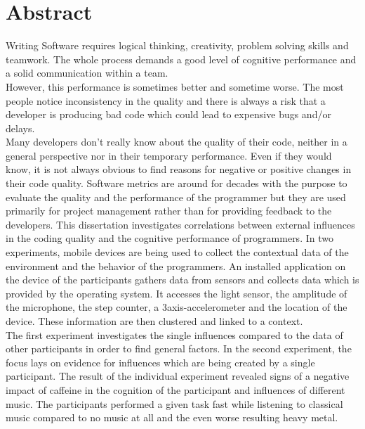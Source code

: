 \section*{Abstract}


Writing Software requires logical thinking, creativity, problem solving skills and teamwork. The whole process demands a good level of cognitive performance and a solid communication within a team.\\
However, this performance is sometimes better and sometime worse. The most people notice inconsistency in the quality and there is always a risk that a developer is producing bad code which could lead to expensive bugs and/or delays.\\
Many developers don't really know about the quality of their code, neither in a general perspective nor in their temporary performance. Even if they would know, it is not always obvious to find reasons for negative or positive changes in their code quality.
Software metrics are around for decades with the purpose to evaluate the quality and the performance of the programmer but they are used primarily for project management rather than for providing feedback to the developers. 
\bigbreak
This dissertation investigates correlations between external influences in the coding quality and the cognitive performance of programmers. 
In two experiments, mobile devices are being used to collect the contextual data of the environment and the behavior of the programmers. 
An installed application on the device of the participants gathers data from sensors and collects data which is provided by the operating system. It accesses the light sensor, the amplitude of the microphone, the step counter, a 3axis-accelerometer and the location of the device. These information are then clustered and linked to a context.\\
The first experiment investigates the single influences compared to the data of other participants in order to find general factors. In the second experiment, the focus lays on evidence for influences which are being created by a single participant. 
\bigbreak
The result of the individual experiment revealed signs of a negative impact of caffeine in the cognition of the participant and influences of different music. The participants performed a given task fast while listening to classical music compared to no music at all and the even worse resulting heavy metal. 



